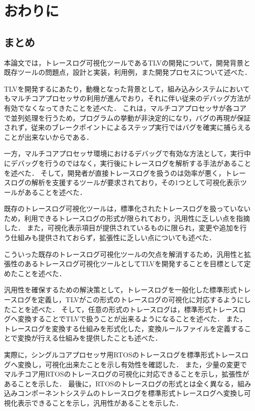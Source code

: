 \chapter{おわりに}

\section{まとめ}

本論文では，トレースログ可視化ツールであるTLVの開発について，開発背景と既存ツールの問題点，設計と実装，利用例，また開発プロセスについて述べた．

TLVを開発するにあたり，動機となった背景として，組み込みシステムにおいてもマルチコアプロセッサの利用が進んでおり，それに伴い従来のデバッグ方法が有効でなくなってきたことを述べた．
これは，マルチコアプロセッサが各コアで並列処理を行うため，プログラムの挙動が非決定的になり，バグの再現が保証されず，従来のブレークポイントによるステップ実行ではバグを確実に捕らえることが出来ないからである．

一方，マルチコアプロセッサ環境におけるデバッグで有効な方法として，実行中にデバッグを行うのではなく，実行後にトレースログを解析する手法があることを述べた．
そして，開発者が直接トレースログを扱うのは効率が悪く，トレースログの解析を支援するツールが要求されており，その1つとして可視化表示ツールがあることを述べた．

既存のトレースログ可視化ツールは，標準化されたトレースログを扱っていないため，利用できるトレースログの形式が限られており，汎用性に乏しい点を指摘した．
また，可視化表示項目が提供されているものに限られ，変更や追加を行う仕組みも提供されておらず，拡張性に乏しい点についても述べた．

こういった既存のトレースログ可視化ツールの欠点を解消するため，汎用性と拡張性のあるトレースログ可視化ツールとしてTLVを開発することを目標として定めたことを述べた．

汎用性を確保するための解決策として，トレースログを一般化した標準形式トレースログを定義し，TLVがこの形式のトレースログの可視化に対応するようにしたことを述べた．
そして，任意の形式のトレースログは，標準形式トレースログへ変換することでTLVで扱うことが出来るようになることを述べた．
また，トレースログを変換する仕組みを形式化した，変換ルールファイルを定義することで変換が行える仕組みを提供したことも述べた．

実際に，シングルコアプロセッサ用RTOSのトレースログを標準形式トレースログへ変換し，可視化出来たことを示し有効性を確認した．
また，少量の変更でマルチコア用RTOSのトレースログの可視化に対応できることを示し，拡張性があることを示した．
最後に，RTOSのトレースログの形式とは全く異なる，組み込みコンポーネントシステムのトレースログを標準形式トレースログへ変換し可視化表示できることを示し，汎用性があることを示した．

